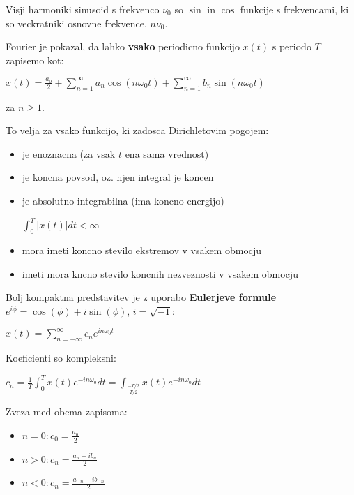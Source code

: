 \documentclass{article}
\begin{document}
\begin{multicols}{4}
Visji harmoniki sinusoid s frekvenco $\nu_0$ so $\sin$ in $\cos$ funkcije s frekvencami,
ki so veckratniki osnovne frekvence, $n \nu_0$.

Fourier je pokazal, da lahko \textbf{vsako} periodicno funkcijo $x(t)$ s periodo $T$ zapisemo kot:
\begin{center}
    \begin{math}
        x(t) = \frac{a_0}{2} + \sum_{n = 1}^{\infty} a_n \cos(n \omega_0 t) +
        \sum_{n = 1}^{\infty} b_n \sin(n \omega_0 t)
    \end{math}
\end{center}
za $n \geq 1$.

To velja za vsako funkcijo, ki zadosca Dirichletovim pogojem:
\begin{itemize}
    \item je enoznacna (za vsak $t$ ena sama vrednost)
    \item je koncna povsod, oz. njen integral je koncen
    \item je absolutno integrabilna (ima koncno energijo)
        \begin{center}
            $\int_0^T |x(t)| dt < \infty$
        \end{center}
    \item mora imeti koncno stevilo ekstremov v vsakem obmocju
    \item imeti mora kncno stevilo koncnih nezveznosti v vsakem obmocju
\end{itemize}

Bolj kompaktna predstavitev je z uporabo \textbf{Eulerjeve formule} $e^{i \phi} = \cos(\phi) + i \sin(\phi)$, $i = \sqrt{-1}$:
\begin{center}
    \begin{math}
        x(t) = \sum_{n = - \infty}^{\infty} c_n e^{i n \omega_0 t}
    \end{math}
\end{center}
Koeficienti so kompleksni:
\begin{center}
    \begin{math}
        c_n = \frac{1}{T} \int_0^T x(t)e^{-in \omega_0} dt = \int_{\frac{-T/2}{T/2}} x(t) e^{-in \omega_0} dt
    \end{math}
\end{center}
Zveza med obema zapisoma:
\begin{itemize}
    \item $n = 0: c_0 = \frac{a_0}{2}$
    \item $n > 0: c_n = \frac{a_n - i b_n}{2}$
    \item $n < 0: c_n = \frac{a_{-n} - i b_{-n}}{2}$
\end{itemize}


\end{multicols}
\end{document}
